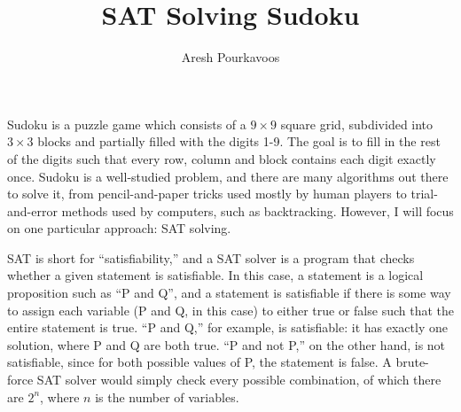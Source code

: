 \documentclass{article}
\begin{document}
\title{SAT Solving Sudoku}
\author{Aresh Pourkavoos}
\maketitle

Sudoku is a puzzle game which consists of a $9 \times 9$ square grid,
subdivided into $3 \times 3$ blocks
and partially filled with the digits 1-9.
The goal is to fill in the rest of the digits such that
every row, column and block contains each digit exactly once.
Sudoku is a well-studied problem,
and there are many algorithms out there to solve it,
from pencil-and-paper tricks used mostly by human players
to trial-and-error methods used by computers, such as backtracking.
However, I will focus on one particular approach: SAT solving.

SAT is short for ``satisfiability,''
and a SAT solver is a program that checks
whether a given statement is satisfiable.
In this case, a statement is a logical proposition
such as ``P and Q'',
and a statement is satisfiable
if there is some way to assign each variable
(P and Q, in this case) to either true or false
such that the entire statement is true.
``P and Q,'' for example, is satisfiable:
it has exactly one solution, where P and Q are both true.
``P and not P,'' on the other hand, is not satisfiable,
since for both possible values of P, the statement is false.
A brute-force SAT solver would simply check every possible combination,
of which there are $2^n$, where $n$ is the number of variables.

\end{document}

